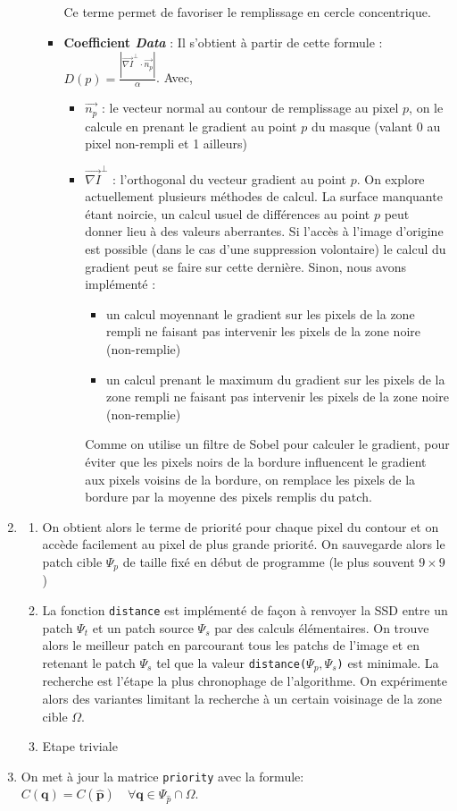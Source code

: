 \documentclass[10pt]{article}
\begin{document}
\begin{enumerate}
\begin{enumerate}
\begin{itemize}
Ce terme permet de favoriser le remplissage en cercle concentrique.
\item \textbf{Coefficient \textit{Data}} : Il s'obtient à partir de cette formule : $D(p) = \frac{|\overrightarrow{\nabla I}^\perp \cdot \overrightarrow{n_p}|}{\alpha}$. Avec,
\begin{itemize}
\item  $\overrightarrow{n_p}$ : le vecteur normal au contour de remplissage au pixel $p$, on le calcule en prenant le gradient au point $p$ du masque (valant 0 au pixel non-rempli et 1 ailleurs)
\item $\overrightarrow{\nabla I}^\perp $ : l'orthogonal du vecteur gradient au point $p$. On explore actuellement plusieurs méthodes de calcul. La surface manquante étant noircie, un calcul usuel de différences au point $p$ peut donner lieu à des valeurs aberrantes. Si l'accès à l'image d'origine est possible (dans le cas d'une suppression volontaire) le calcul du gradient peut se faire sur cette dernière. Sinon, nous avons implémenté : \begin{itemize} \item un calcul moyennant le gradient sur les pixels de la zone rempli ne faisant pas intervenir les pixels de la zone noire (non-remplie) \item un calcul prenant le maximum du gradient sur les pixels de la zone rempli ne faisant pas intervenir les pixels de la zone noire (non-remplie)  \end{itemize}
Comme on utilise un filtre de Sobel pour calculer le gradient, pour éviter que les pixels noirs de la bordure influencent le gradient aux pixels voisins de la bordure, on remplace les pixels de la bordure par la moyenne des pixels remplis du patch. 
\end{itemize}
\end{itemize}
\end{enumerate}
\item \begin{enumerate}
\item On obtient alors le terme de priorité pour chaque pixel du contour et on accède facilement au pixel de plus grande priorité. On sauvegarde alors le patch cible $\Psi_p$ de taille fixé en début de programme (le plus souvent $9 \times 9$)
\item La fonction \verb+distance+ est implémenté de façon à renvoyer la SSD entre un patch $\Psi_t$ et un patch source $\Psi_s$ par des calculs élémentaires. On trouve alors le meilleur patch en parcourant tous les patchs de l'image et en retenant le patch $\Psi_s$ tel que la valeur \verb+distance(+$\Psi_p, \Psi_s$\verb+)+ est minimale. La recherche est l'étape la plus chronophage de l'algorithme. On expérimente alors des variantes limitant la recherche à un certain voisinage de la zone cible $\Omega$.
\item Etape triviale
\end{enumerate}
\item On met à jour la matrice \verb+priority+ avec la formule: $C(\mathbf{q}) = C(\hat{\mathbf{p}}) \quad \forall \mathbf{q} \in \Psi_{\hat{p}} \cap \Omega$.

\end{enumerate}
\end{document}
